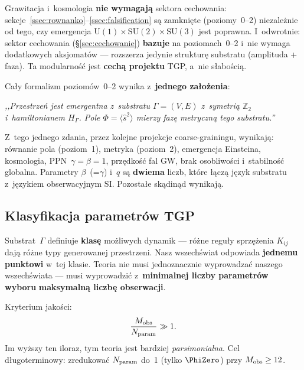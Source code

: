 \begin{remark}\label{rem:niezaleznosc}
Grawitacja i~kosmologia \textbf{nie wymagaj\k{a}} sektora cechowania:
sekcje~\ref{ssec:rownanko}--\ref{ssec:falsification} s\k{a} zamkni\k{e}te
(poziomy~0--2) niezale\.znie od tego, czy emergencja $\mathrm{U}(1)\times
\mathrm{SU}(2)\times\mathrm{SU}(3)$ jest poprawna.
I~odwrotnie: sektor cechowania (\S\ref{sec:cechowanie}) \textbf{bazuje}
na poziomach~0--2 i~nie wymaga dodatkowych aksjomat\'ow ---
rozszerza jedynie struktur\k{e} substratu (amplituda + faza).
Ta modularno\'s\'c jest \textbf{cech\k{a} projektu} TGP, a~nie s\l{}abo\'sci\k{a}.
\end{remark}

\begin{remark}\label{rem:minimalna-zasada}
Ca\l{}y formalizm poziom\'ow~0--2 wynika z~\textbf{jednego za\l{}o\.zenia}:
\begin{center}
\textit{,,Przestrze\'n jest emergentna z~substratu $\Gamma=(V,E)$
z~symetri\k{a} $\mathbb{Z}_2$ i~hamiltonianem $H_\Gamma$.
Pole $\Phi = \langle\hat{s}^2\rangle$ mierzy faz\k{e} metryczn\k{a}
tego substratu.''}
\end{center}
Z~tego jednego zdania, przez kolejne projekcje coarse-grainingu,
wynikaj\k{a}: r\'ownanie pola (poziom~1), metryka (poziom~2),
emergencja Einsteina, kosmologia, PPN~$\gamma=\beta=1$,
prz\k{e}dko\'s\'c fal GW, brak osobliwo\'sci i~stabilno\'s\'c globalna.
Parametry $\beta$~(=$\gamma$) i~$q$ s\k{a} \textbf{dwiema} liczb,
kt\'ore \l{}\k{a}cz\k{a} j\k{e}zyk substratu z~j\k{e}zykiem obserwacyjnym
SI. Pozosta\l{}e sk\k{a}din\k{a}d wynikaj\k{a}.
\end{remark}

\subsection{Klasyfikacja parametr\'ow TGP}\label{ssec:param-classification}

\begin{remark}%
\label{rem:multiverse-philosophy}
Substrat~$\Gamma$ definiuje \textbf{klas\k{e}} mo\.zliwych dynamik ---
r\'o\.zne regu\l{}y sprz\k{e}\.zenia $K_{ij}$ daj\k{a} r\'o\.zne typy
generowanej przestrzeni. Nasz wszech\'swiat odpowiada
\textbf{jednemu punktowi} w~tej klasie.
Teoria nie musi jednoznacznie wyprowadza\'c naszego wszech\'swiata
--- musi wyprowadzi\'c z~\textbf{minimalnej liczby parametr\'ow wyboru}
\textbf{maksymaln\k{a} liczb\k{e} obserwacji}.

Kryterium jako\'sci:
\[
  \frac{M_{\rm obs}}{N_{\rm param}} \gg 1.
\]
Im wy\.zszy ten iloraz, tym teoria jest bardziej \emph{parsimonialna}.
Cel d\l{}ugoterminowy: zredukowa\'c $N_{\rm param}$ do~1
(tylko $\PhiZero$) przy $M_{\rm obs} \geq 12$.
\end{remark}

